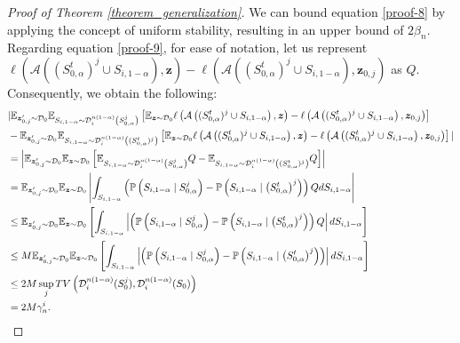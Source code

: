 \begin{proof}[Proof of Theorem \ref{theorem_generalization}]
We can bound equation \ref{proof-8} by applying the concept of uniform stability, resulting in an upper bound of $2\beta_n$. Regarding equation \ref{proof-9}, for ease of notation, let us represent $\ell\left(\mathcal{A}\left((S_{0,\alpha}^t)^j \cup S_{i,1-\alpha}\right), \boldsymbol{z}\right)-\ell\left(\mathcal{A}\left((S_{0,\alpha}^t)^j \cup S_{i,1-\alpha}\right), \boldsymbol{z}_{0,j}\right)$ as $Q$. Consequently, we obtain the following:
\begin{align}
&|\mathbb{E}_{\boldsymbol{z}_{0,j}^{\prime} \sim \mathcal{D}_0} \mathbb{E}_{S_{i,1-\alpha} \sim \mathcal{D}_i^{n(1-\alpha)}\left(S_{0,\alpha}^j\right)} \left[\mathbb{E}_{\boldsymbol{z} \sim \mathcal{D}_0} \ell\left(\mathcal{A}\left((S_{0,\alpha}^t)^j \cup S_{i,1-\alpha}\right), \boldsymbol{z}\right)-\ell\left(\mathcal{A}\left((S_{0,\alpha}^t)^j \cup S_{i,1-\alpha}\right), \boldsymbol{z}_{0,j}\right)\right] \notag\\
&-\mathbb{E}_{\boldsymbol{z}_{0,j}^{\prime} \sim \mathcal{D}_0} \mathbb{E}_{S_{i,1-\alpha} \sim \mathcal{D}_i^{n(1-\alpha)}\left((S_{0,\alpha}^t)^j\right)}\left[\mathbb{E}_{\boldsymbol{z} \sim \mathcal{D}_0} \ell\left(\mathcal{A}\left((S_{0,\alpha}^t)^j \cup S_{i,1-\alpha}\right), \boldsymbol{z}\right)-\ell\left(\mathcal{A}\left((S_{0,\alpha}^t)^j \cup S_{i,1-\alpha}\right), \boldsymbol{z}_{0,j}\right)\right]| \notag \\
&=\left|\mathbb{E}_{\boldsymbol{z}_{0,j}^{\prime} \sim \mathcal{D}_0} \mathbb{E}_{\boldsymbol{z} \sim \mathcal{D}_0}\left[\mathbb{E}_{S_{i,1-\alpha} \sim \mathcal{D}_i^{n(1-\alpha)}\left(S_{0,\alpha}^j\right)} Q-\mathbb{E}_{S_{i,1-\alpha} \sim \mathcal{D}_i^{n(1-\alpha)}\left((S_{0,\alpha}^t)^j\right)} Q\right]\right|\notag \\
& =\mathbb{E}_{\boldsymbol{z}_{0,j}^{\prime} \sim \mathcal{D}_0} \mathbb{E}_{\boldsymbol{z} \sim \mathcal{D}_0}\left|\int_{S_{i,1-\alpha}}\left(\mathbb{P}\left(S_{i,1-\alpha} \mid S^j_{0,\alpha}\right)-\mathbb{P}\left(S_{i,1-\alpha} \mid\left(S^t_{0,\alpha}\right)^j\right)\right) Q d S_{i,1-\alpha}\right| \notag\\
& \leq \mathbb{E}_{\boldsymbol{z}_{0,j}^{\prime} \sim \mathcal{D}_0} \mathbb{E}_{\boldsymbol{z} \sim \mathcal{D}_0}\left[\int_{S_{i,1-\alpha}}\left|\left(\mathbb{P}\left(S_{i,1-\alpha} \mid S^j_{0,\alpha}\right)-\mathbb{P}\left(S_{i,1-\alpha} \mid\left(S^t_{0,\alpha}\right)^j\right)\right) Q\right| d S_{i,1-\alpha}\right] \notag\\
& \leq M \mathbb{E}_{\boldsymbol{z}_{0,j}^{\prime} \sim \mathcal{D}_0} \mathbb{E}_{\boldsymbol{z} \sim \mathcal{D}_0}\left[\int_{S_{i,1-\alpha}}\left|\left(\mathbb{P}\left(S_{i,1-\alpha} \mid S^j_{0,\alpha}\right)-\mathbb{P}\left(S_{i,1-\alpha} \mid\left(S^t_{0,\alpha}\right)^j\right)\right) \right| d S_{i,1-\alpha}\right] \notag\\
& \leq 2 M \sup _j TV\left(\mathcal{D}_i^{n(1-\alpha)}(S_0^j), \mathcal{D}_i^{n(1-\alpha)}(S_0)\right)\notag \\
&= 2M \gamma_n^i \label{proof_19}.
\end{align}


\end{proof}
